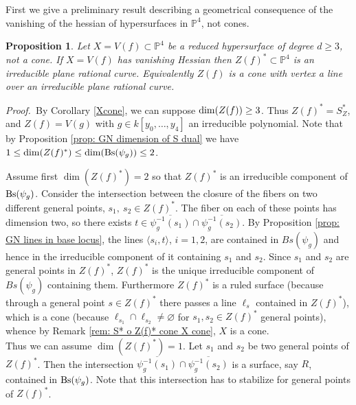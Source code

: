 \documentclass[11pt,a4paper]{amsart}
\newtheorem{prop}[theorem]{Proposition}
\newcommand{\bprf}{{\it Proof.~}}
\newcommand{\PP}{ \mathbb{P}}
\begin{document}
First we give a preliminary result describing a geometrical
consequence of the vanishing of the hessian of hypersurfaces in
$\PP^4$, not cones.

\begin{prop}\label{case n=4}
Let $X=V(f)\subset\mathbb{P}^4$ be a reduced hypersurface of
degree $d\geq 3$, not a cone. If $X=V(f)$ has vanishing Hessian
then $Z(f)^*\subset\PP^4$ is an irreducible plane rational curve.
 Equivalently
$Z(f)$ is a  cone with vertex a line  over an irreducible plane
rational curve.
\end{prop}
\bprf By Corollary \ref{Xcone}, we can suppose ${\rm
dim}(Z(f))\geq 3$. Thus $Z(f)^*=S^*_Z$, and $Z(f)=V(g)$  with
$g\in k[y_0,\ldots ,y_4]$ an irreducible polynomial. Note  that by
Proposition \ref{prop: GN dimension of S dual} we have $1\leq \dim
(Z(f)^*)\leq \dim({\rm Bs}(\psi_g))\leq 2$.

\smallskip Assume first $\dim (Z(f)^*)=2$ so that $Z(f)^*$ is an irreducible component of
${\rm Bs}(\psi_g)$. Consider the intersection between the closure
of the fibers on two different general points, ${s_1},\ {s_2}\in
Z(f)^*$. The fiber on each of these points has dimension two, so
there exists
${t}\in\overline{\psi_g^{-1}({s_1})}\cap\overline{\psi_g^{-1}({s_2})}$.
By Proposition \ref{prop: GN lines in base locus}, the lines
$\langle {s_i},{t}\rangle$, $i=1,2$, are contained in $Bs(\psi_g)$
and hence in the irreducible component of it containing $s_1$ and
$s_2$. Since $s_1$ and $s_2$ are general points in $Z(f)^*$,
$Z(f)^*$ is the unique irreducible component of $Bs(\psi_g)$
containing them. Furthermore  $Z(f)^*$ is a ruled surface (because
through a general point $s\in Z(f)^*$ there passes a line $\ell_s$
contained in $Z(f)^*$), which is a  cone (because $\ell
_{s_1}\cap\ell_{s_2}\neq\varnothing$ for $s_1,s_2\in Z(f)^*$
general points), whence by Remark \ref{rem: S* o Z(f)* cone X
cone}, $X$ is a cone.\\
Thus we can assume $\dim (Z(f)^*)=1$. Let ${s_1}$ and ${s_2}$ be
two general points of $Z(f)^*$. Then the intersection
$\overline{\psi_g ^{-1}({s_1})}\cap\overline{\psi_g ^{-1}({s_2})}$
is a surface, say $R$, contained in ${\rm Bs}(\psi_g)$. Note that
this intersection has to stabilize for general points of $Z(f)^*$.
\end{document}

